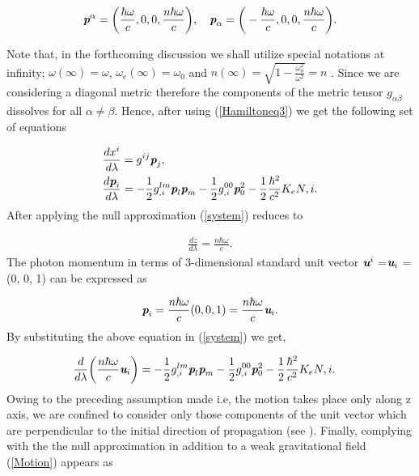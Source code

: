 \documentclass[final,5p,times,twocolumn,unknownkeysallowed]{elsarticle}
\begin{document}
\begin{align}\label{momentumcomp}
\textit{\textbf{p}}^\alpha=\bigg(\frac{\hbar \omega}{c},0,0,\frac{n \hbar \omega}{c}\bigg), \quad \textit{\textbf{p}}_\alpha=\bigg(-\frac{\hbar \omega}{c},0,0,
\frac{n \hbar \omega}{c}\bigg).
\end{align}

Note that, in the forthcoming discussion we shall utilize special notations at infinity;
$\omega(\infty)=\omega$, $\omega_e(\infty)=\omega_0$  and $n(\infty)=\sqrt{1-\frac{\omega^2_0}{\omega^2}}=n$ .
Since we are considering a diagonal metric therefore the components of the metric tensor
$g_{\alpha\beta}$ dissolves for all $\alpha\neq \beta$. Hence, after using (\ref{Hamiltoneq3})
we get the following set of equations

\begin{align}\label{system}
\frac{dx^i}{d\lambda}&=g^{ij}\textit{\textbf{p}}_j, \nonumber\\
\frac{d\textit{\textbf{p}}_i}{d\lambda}&=-\frac{1}{2}g^{lm}_{,i}\textit{\textbf{p}}_l\textit{\textbf{p}}_m-\frac{1}{2}g^{00}_{,i}\textit{\textbf{p}}^2_0-\frac{1}{2}\frac{\hbar^2}
{c^2}K_eN,i.
\end{align}
After applying the null approximation (\ref{system}) reduces to

\begin{align}
\frac{dz}{d\lambda}=\frac{n\hbar \omega}{c}.
\end{align}
The photon momentum in terms of 3-dimensional standard unit vector $\textit{\textbf{u}}^i$ =$\textit{\textbf{u}}_i$ = (0, 0, 1)
can be expressed as

\begin{align}\label{momentcomp}
\textit{\textbf{p}}_i=\frac{n\hbar \omega}{c}(0,0,1)=\frac{n\hbar \omega}{c}\textit{\textbf{u}}_i.
\end{align}
By substituting the above equation in (\ref{system}) we get,

\begin{align}\label{Motion}
\frac{d}{d\lambda}\bigg(\frac{n\hbar \omega}{c}\textit{\textbf{u}}_i\bigg)&=-\frac{1}{2}g^{lm}_{,i}\textit{\textbf{p}}_l\textit{\textbf{p}}_m-
\frac{1}{2}g^{00}_{,i}\textit{\textbf{p}}^2_0-\frac{1}{2}\frac{\hbar^2}{c^2}K_eN,i.
\end{align}
Owing to the preceding assumption made i.e, the motion takes place
only along z axis, we are confined to consider only those components of the unit vector
which are perpendicular to the initial direction of propagation (see \cite{Bin:2010a}). Finally, complying with the
the null approximation in addition to a weak gravitational field (\ref{Motion}) appears as
\end{document}
